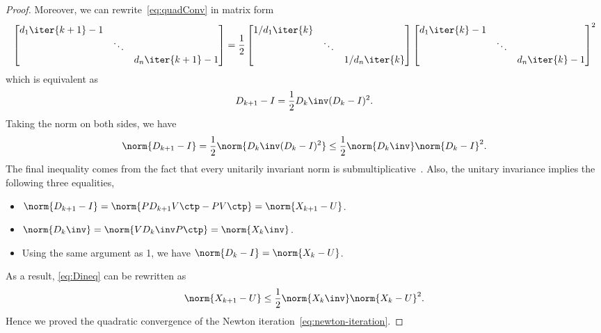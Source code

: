 \documentclass{article}
\numberwithin{equation}{section} %
\newcommand{\gnorm}[1]{\norm{#1}}
\begin{document}
\begin{proof}
Moreover, we can rewrite~\eqref{eq:quadConv} in matrix form
\begin{equation}
  \notag
  \begin{bmatrix}
    d_1\iter{k+1}-1 & & \\
                    & \ddots & \\
                    & & d_n\iter{k+1}-1
  \end{bmatrix} = 
  \frac{1}{2}
  \begin{bmatrix}
    1/d_1\iter{k} & & \\
                  & \ddots & \\
                  & & 1/d_n\iter{k}
  \end{bmatrix}
  \begin{bmatrix}
    d_1\iter{k}-1 & & \\
                  & \ddots & \\
                  & & d_n\iter{k}-1
  \end{bmatrix}^2
\end{equation}
which is equivalent as
\begin{equation}
  \notag 
  D_{k+1} - I = \frac{1}{2} D_k\inv (D_k - I)^2.
\end{equation}
Taking the norm on both sides, we have
\begin{equation}
  \label{eq:Dineq} 
  \gnorm{D_{k+1} - I} = \frac{1}{2} \gnorm{D_k\inv (D_k - I)^2}\leq \frac{1}{2} \gnorm{D_k\inv}\gnorm{D_k - I}^2.
\end{equation}
The final inequality comes from the fact that every unitarily invariant
norm is submultiplicative~. Also, the unitary invariance
implies the following three equalities,
\begin{itemize}
\item
$\gnorm{D_{k+1}- I} = \gnorm{PD_{k+1} V\ctp - PV\ctp} = \gnorm{X_{k+1} -
  U}$.
\item $\gnorm{D_k\inv} = \gnorm{VD_k\inv P\ctp} =\gnorm{X_k\inv}$.
\item Using the same argument as 1, we have
$\gnorm{D_k - I} = \gnorm{X_k - U}$.
\end{itemize}
As a result, \eqref{eq:Dineq} can be rewritten as
\begin{equation}\notag
  \gnorm{X_{k+1} - U} \leq \frac 12 \gnorm{X_k\inv}\gnorm{X_k - U}^2.
\end{equation}
Hence we proved the quadratic convergence of the Newton
iteration~\eqref{eq:newton-iteration}.
\end{proof}
\end{document}
